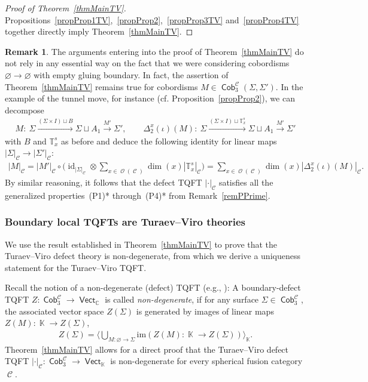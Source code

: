 \documentclass[pdftex]{sigma}
\DeclareMathOperator{\id}{id}
\DeclareMathOperator{\vect}{\mathsf{Vect}}
\DeclareMathOperator{\K}{\mathbb{K}}
\DeclareMathOperator{\C}{\mathbb{C}}
\DeclareMathOperator{\Cob}{\mathsf{Cob}}
\DeclareMathOperator{\calc}{\mathcal{C}}
\DeclareMathOperator{\calo}{\mathcal{O}}
\numberwithin{equation}{section}
\theoremstyle{definition}
\newtheorem{Remark}[Remark]{Remark}
\begin{document}
\begin{proof}[Proof of Theorem~\ref{thmMainTV}]
 Propositions~\ref{propProp1TV},~\ref{propProp2},~\ref{propProp3TV} and~\ref{propProp4TV} together directly imply Theorem~\ref{thmMainTV}.
\end{proof}
\begin{Remark}\label{remTVPPrime}
The arguments entering into the proof of Theorem~\ref{thmMainTV} do not rely in any essential way on the fact that we were considering cobordisms $\varnothing \rightarrow \varnothing$ with empty gluing boundary. In fact, the assertion of Theorem~\ref{thmMainTV} remains true for cobordisms $M \in \Cob_3^{\calc}(\Sigma, \Sigma')$. In the example of the tunnel move, for instance (cf. Proposition~\ref{propProp2}), we can decompose
 \begin{align*}
 M\colon \ \Sigma \xrightarrow{(\Sigma \times I) \sqcup B} \Sigma \sqcup A_1 \xrightarrow{M'} \Sigma', \qquad \Delta_2^x(\iota)(M)\colon \ \Sigma \xrightarrow{(\Sigma \times I) \sqcup \mathbb{T}_x^s} \Sigma \sqcup A_1 \xrightarrow{M'} \Sigma'
 \end{align*}
 with $B$ and $\mathbb{T}_x^s$ as before and deduce the following identity for linear maps $|\Sigma|_{\calc} \rightarrow |\Sigma'|_{\calc}$:
 \begin{align*}
 \allowbreak |M|_{\calc} = |M'|_{\calc} \circ \biggl(\id_{|\Sigma|_{\calc}} \otimes \sum_{x \in \calo(\calc)}\dim(x)|\mathbb{T}_x^s|_{\calc} \biggr) = \sum_{x \in \calo(\calc)}\dim(x)|\Delta_2^x(\iota)(M)|_{\calc}.
 \end{align*}
 By similar reasoning, it follows that the defect TQFT $|\cdot|_{\calc}$ satisfies all the generalized properties~(P1)* through~(P4)* from Remark~\ref{remPPrime}.
\end{Remark}

\subsubsection{Boundary local TQFTs are Turaev--Viro theories}\label{subsecND}
We use the result established in Theorem~\ref{thmMainTV} to prove that the Turaev--Viro defect theory is non-degenerate, from which we derive a uniqueness statement for the Turaev--Viro TQFT.

Recall the notion of a non-degenerate (defect) TQFT (e.g., \cite[Section 15.2.3]{TV}): A boundary-defect TQFT $Z\colon \Cob_3^{\calc} \rightarrow \vect_{\C}$ is called \textit{non-degenerate}, if for any surface $\Sigma \in \Cob_3^{\calc}$, the associated vector space $Z(\Sigma)$ is generated by images of linear maps $Z(M)\colon \K \rightarrow Z(\Sigma)$,
\begin{align*}
 Z(\Sigma) = \biggl \langle \bigcup_{M\colon \varnothing \rightarrow \Sigma} \mathrm{im} ( Z(M)\colon \K \rightarrow Z(\Sigma) )\biggr\rangle_{\K}.
\end{align*}
Theorem~\ref{thmMainTV} allows for a direct proof that the Turaev--Viro defect TQFT $|\cdot|_{\calc}\colon \Cob_3^{\calc} \rightarrow \vect_{\K}$ is non-degenerate for every spherical fusion category $\calc$.
\end{document}
